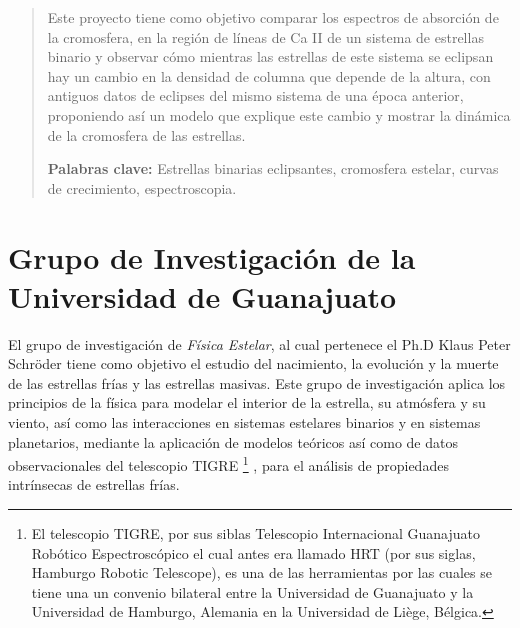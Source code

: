 \documentclass[11pt]{article}
\begin{document}
\newpage
\begin{abstract}
\noindent Este proyecto tiene como objetivo comparar los espectros de absorción de la cromosfera, en la región de líneas de Ca II de un sistema de estrellas binario y observar cómo mientras las estrellas de este sistema se eclipsan hay un cambio en la densidad de columna que depende de la altura, con antiguos datos de eclipses del mismo sistema de una época anterior, proponiendo así un modelo que explique este cambio y mostrar la dinámica de la cromosfera de las estrellas.

\vspace{0.5cm}
\textbf{Palabras clave:} Estrellas binarias eclipsantes, cromosfera estelar, curvas de crecimiento, espectroscopia.

\end{abstract}


\begin{figure}
  \centering

  \label{Figura 1}
\end{figure}


\section{Grupo de Investigación de la Universidad de Guanajuato}

El grupo de investigación de \textit{Física Estelar}, al cual pertenece el Ph.D Klaus Peter Schröder tiene como objetivo el estudio del nacimiento, la evolución y la muerte de las estrellas frías y las estrellas masivas.  Este grupo de investigación aplica los principios de la física para modelar el interior de la estrella, su atmósfera y su viento, así como las interacciones en sistemas estelares binarios y en sistemas planetarios, mediante la aplicación de modelos teóricos así como de datos observacionales del telescopio TIGRE  \footnote{El telescopio TIGRE, por sus siblas Telescopio Internacional Guanajuato Robótico Espectroscópico el cual antes era llamado HRT (por sus siglas, Hamburgo Robotic Telescope), es una de las herramientas por las cuales se tiene una un convenio bilateral entre la Universidad de Guanajuato y la Universidad de Hamburgo, Alemania en la Universidad de Liège, Bélgica.} \cite{schmitt2014tigre}, para el análisis de propiedades intrínsecas de estrellas frías.
\end{document}
